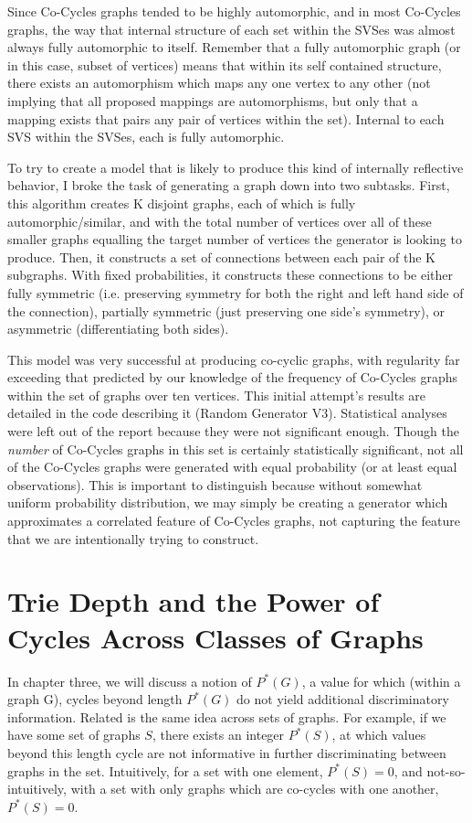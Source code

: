 Since Co-Cycles graphs tended to be highly automorphic, and in most Co-Cycles graphs, the way that internal structure of each set within the SVSes was almost always fully automorphic to itself.
Remember that a fully automorphic graph (or in this case, subset of vertices) means that within its self contained structure, there exists an automorphism which maps any one vertex to any other (not implying that all proposed mappings are automorphisms, but only that a mapping exists that pairs any pair of vertices within the set).
Internal to each SVS within the SVSes, each is fully automorphic.

To try to create a model that is likely to produce this kind of internally reflective behavior, I broke the task of generating a graph down into two subtasks.
First, this algorithm creates K disjoint graphs, each of which is fully automorphic/similar, and with the total number of vertices over all of these smaller graphs equalling the target number of vertices the generator is looking to produce.
Then, it constructs a set of connections between each pair of the K subgraphs.
With fixed probabilities, it constructs these connections to be either fully symmetric (i.e. preserving symmetry for both the right and left hand side of the connection), partially symmetric (just preserving one side's symmetry), or asymmetric (differentiating both sides).

This model was very successful at producing co-cyclic graphs, with regularity far exceeding that predicted by our knowledge of the frequency of Co-Cycles graphs within the set of graphs over ten vertices.
This initial attempt's results are detailed in the code describing it (Random Generator V3).
Statistical analyses were left out of the report because they were not significant enough.
Though the \emph{number} of Co-Cycles graphs in this set is certainly statistically significant, not all of the Co-Cycles graphs were generated with equal probability (or at least equal observations).
This is important to distinguish because without somewhat uniform probability distribution, we may simply be creating a generator which approximates a correlated feature of Co-Cycles graphs, not capturing the feature that we are intentionally trying to construct. 


\section{Trie Depth and the Power of Cycles Across Classes of Graphs}

In chapter three, we will discuss a notion of $P^*(G)$, a value for which (within a graph G), cycles beyond length $P^*(G)$ do not yield additional discriminatory information.
Related is the same idea across sets of graphs.
For example, if we have some set of graphs $S$, there exists an integer $P^*(S)$, at which values beyond this length cycle are not informative in further discriminating between graphs in the set.
Intuitively, for a set with one element, $P^*(S) = 0$, and not-so-intuitively, with a set with only graphs which are co-cycles with one another, $P^*(S) = 0$.


